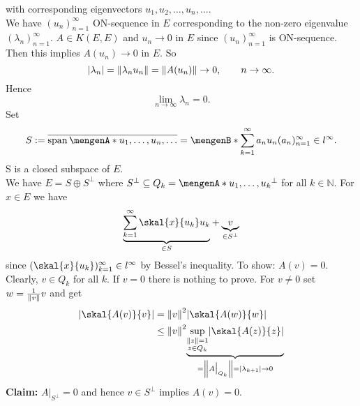 \begin{beweis}
\begin{description}
\[		\]
		with corresponding eigenvectors $u_1,u_2, \dots,u_n, \dots$. \\
		We have $(u_n)_{n=1}^{\infty}$ ON-sequence in $E$ corresponding to the non-zero eigenvalue $(\lambda_n)_{n=1}^{\infty}$. $A \in K(E,E)$ and $u_n \to 0$ in $E$ since 
		$(u_n)_{n=1}^{\infty}$ is ON-sequence. \\
		Then this implies $A(u_n) \to 0$ in $E$. So \[
			\abs{\lambda_n} = \norm{\lambda_n u_n} = \norm{A(u_n)} \to 0, \qquad n \to \infty.
		\]
		Hence \[
			\lim_{n \to \infty} \lambda_n = 0.
		\]
		Set 
		\[
			S := \overline{\spn\set{u_1, \dots,u_n, \dots}} = \set[\sum_{k=1}^{\infty}a_n u_n]{ (a_n)_{n=1}^{\infty} \in l^\infty}.
		\]
		S is a closed subspace of $E$. \\ We have $E = S \oplus S^{\perp}$ where $S^{\perp} \subseteq Q_k = \set{u_1,\dots,u_k}^{\perp}$ for all $k \in \mathbb{N}$.
		For $x \in E$ we have
		\[
			\underset{\in S}{\underbrace{\sum_{k=1}^{\infty} \skal{x}{u_k}u_k}} + \underset{\in S^{\perp}}{\underbrace{v}}
		\]
		since $(\skal{x}{u_k})_{k=1}^{\infty} \in l^\infty$ by Bessel's inequality. 
		To show: $A(v)=0$. Clearly, $v \in Q_k$ for all $k$. If $v = 0$ there is nothing to prove. For $v \neq 0$ set $w= \frac{1}{\norm{v}}v$ and get
		\begin{align*}
			\abs{\skal{A(v)}{v}} &= \norm{v}^2 \abs{ \skal{A(w)}{w}} \\
			&\leq \norm{v}^2 \underset{= \norm{A  \big|_{Q_k}^{}} = \abs{\lambda_{k+1}} \to 0}{\underbrace{\sup_{ \substack{\norm{z}=1 \\ z \in Q_k}} \abs{\skal{A(z)}{z}}}}
		\end{align*}
		\textbf{Claim:} \text{    }$A  \big|_{S^{\perp}}^{} = 0$ and hence $v \in S^{\perp}$ implies $A(v) = 0$.
	\end{description}
\end{beweis}


